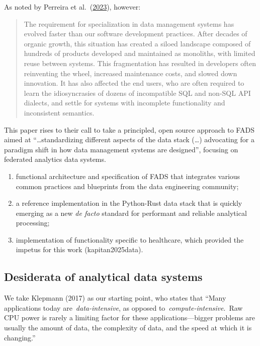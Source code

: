 \documentclass[
  letterpaper,
  DIV=11,
  numbers=noendperiod]{scrartcl}
\providecommand{\tightlist}{%
  \setlength{\itemsep}{0pt}\setlength{\parskip}{0pt}}\usepackage{longtable,booktabs,array}
\begin{document}
As noted by Perreira et
al.~(\href{https://dl.acm.org/doi/10.14778/3603581.3603604}{2023}),
however:

\begin{quote}
The requirement for specialization in data management systems has
evolved faster than our software development practices. After decades of
organic growth, this situation has created a siloed landscape composed
of hundreds of products developed and maintained as monoliths, with
limited reuse between systems. This fragmentation has resulted in
developers often reinventing the wheel, increased maintenance costs, and
slowed down innovation. It has also affected the end users, who are
often required to learn the idiosyncrasies of dozens of incompatible SQL
and non-SQL API dialects, and settle for systems with incomplete
functionality and inconsistent semantics.
\end{quote}

This paper rises to their call to take a principled, open source
approach to FADS aimed at ``\ldots standardizing different aspects of
the data stack (\ldots) advocating for a paradigm shift in how data
management systems are designed'', focusing on federated analytics data
systems.

\begin{enumerate}
\def\labelenumi{\arabic{enumi}.}
\tightlist
\item
  functional architecture and specification of FADS that integrates
  various common practices and blueprints from the data engineering
  community;
\item
  a reference implementation in the Python-Rust data stack that is
  quickly emerging as a new \emph{de facto} standard for performant and
  reliable analytical processing;
\item
  implementation of functionality specific to healthcare, which provided
  the impetus for this work (kapitan2025data).
\end{enumerate}

\subsection{Desiderata of analytical data
systems}\label{desiderata-of-analytical-data-systems}

We take Klepmann (2017) as our starting point, who states that ``Many
applications today are~\emph{data-intensive}, as opposed
to~\emph{compute-intensive}.~Raw CPU power is rarely a limiting factor
for these applications---bigger problems are usually the amount of data,
the complexity of data, and the speed at which it is changing.''
\end{document}

